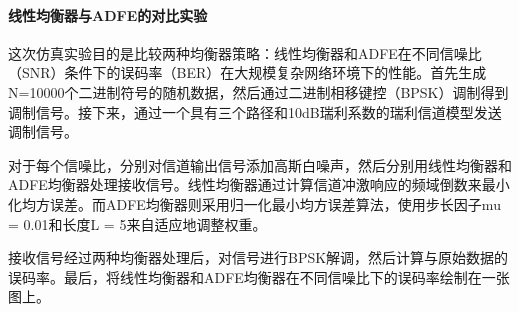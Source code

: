 \documentclass[UTF8,a4paper,12pt]{ctexart}
\numberwithin{equation}{section}
\begin{document}
	\paragraph{线性均衡器与ADFE的对比实验}
	这次仿真实验目的是比较两种均衡器策略：线性均衡器和ADFE在不同信噪比（SNR）条件下的误码率（BER）在大规模复杂网络环境下的性能。首先生成N=10000个二进制符号的随机数据，然后通过二进制相移键控（BPSK）调制得到调制信号。接下来，通过一个具有三个路径和10dB瑞利系数的瑞利信道模型发送调制信号。
	
	对于每个信噪比，分别对信道输出信号添加高斯白噪声，然后分别用线性均衡器和ADFE均衡器处理接收信号。线性均衡器通过计算信道冲激响应的频域倒数来最小化均方误差。而ADFE均衡器则采用归一化最小均方误差算法，使用步长因子mu = 0.01和长度L = 5来自适应地调整权重。
	
	接收信号经过两种均衡器处理后，对信号进行BPSK解调，然后计算与原始数据的误码率。最后，将线性均衡器和ADFE均衡器在不同信噪比下的误码率绘制在一张图上。
\end{document}
